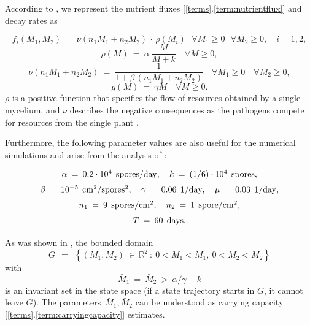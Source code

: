 \documentclass[11pt]{amsart}
\begin{document}
According to \cite{YegorovGrognardMailleretHalkettBernhard2019}, we represent
the nutrient fluxes [\ref{terms}.\ref{term:nutrientflux}] and decay rates as

\begin{equation}
f_i(M_1, M_2) \: = \: \nu(n_1 M_1 + n_2 M_2) \, \cdot \, \rho(M_i) \:\:\:
\forall M_1 \geqslant 0 \:\:\: \forall M_2 \geqslant 0, \quad i = 1,2, 
  \label{4}
\end{equation}
\begin{equation}
\rho(M) \: = \: \alpha \: \dfrac{M}{M + k} \quad \forall M \geqslant 0, 
  \label{5_1}
\end{equation}
\begin{equation}
\nu(n_1 M_1 + n_2 M_2) \: = \: \dfrac{1}{1 + \beta \, (n_1 M_1 + n_2 M_2)}
  \quad
\forall M_1 \geqslant 0 \quad \forall M_2 \geqslant 0,  \label{5_2}
\end{equation}
\begin{equation}
g(M) \: = \: \gamma M \quad \forall M \geqslant 0.  \label{6}
\end{equation}
$\rho$ is a positive function that specifies the flow of resources obtained by a single mycelium, and $\nu$ describes the negative consequences as the pathogens compete for resources from the single plant  \cite{YegorovGrognardMailleretHalkettBernhard2019}.

Furthermore, the following parameter values are also useful for the numerical
simulations and arise from the analysis of
\cite{YegorovGrognardMailleretHalkett2017}:
\begin{equation}
\arraycolsep=1.3pt
\def\arraystretch{1.5}
\begin{array}{c}
\alpha \: = \: 0.2 \cdot 10^4 \:\: \mathrm{spores} / \mathrm{day}, \quad
k \: = \: (1/6) \cdot 10^4 \:\: \mathrm{spores}, \\
\beta \: = \: 10^{-5} \:\: \mathrm{cm}^2 / \mathrm{spores}^2, \quad \gamma
  \: = \: 0.06 \:\: 1 / \mathrm{day}, \quad
\mu \: = \: 0.03 \:\: 1 / \mathrm{day}, \\
n_1 \: = \: 9 \:\: \mathrm{spores} / \mathrm{cm}^2, \quad n_2 \: = \: 1 \:\:
  \mathrm{spore} / \mathrm{cm}^2, \\
T \: = \: 60 \:\: \mathrm{days}.
\end{array}  \label{19}
\end{equation}

As was shown in \cite{YegorovGrognardMailleretHalkettBernhard2019}, the bounded
domain
\begin{equation}
G \:\: = \:\: \left\{ (M_1, M_2) \: \in \: \mathbb{R}^2 \: \colon \: 0 < M_1 <
  \bar{M}_1, \:
0 < M_2 < \bar{M}_2 \right\}  \label{2}
\end{equation}
with
\begin{equation}
\bar{M}_1 \: = \: \bar{M}_2 \: > \: \alpha / \gamma - k  \label{2_1}
\end{equation}
is an invariant set in the state space (if a state trajectory starts in $ G $,
it cannot leave $ G $). The parameters~$ \bar{M}_1, \bar{M}_2 $ can be
understood as 
carrying capacity [\ref{terms}.\ref{term:carryingcapacity}] estimates. 
\end{document}
